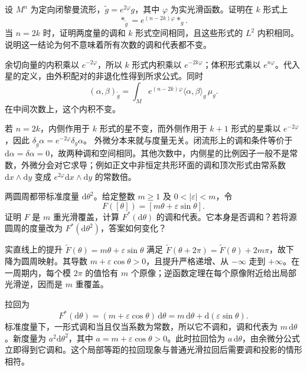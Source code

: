 \begin{exercise}\label{g3:ex:conformal-middle-hodge}
	设 \(M^n\) 为定向闭黎曼流形，\(\widetilde g=e^{2\varphi}g\)，其中 \(\varphi\) 为实光滑函数。证明在 \(k\) 形式上
	\[
		*_{\widetilde g}=e^{(n-2k)\varphi}*_g.
	\]
	当 \(n=2k\) 时，证明两度量的调和 \(k\) 形式空间相同，且这些形式的 \(L^2\) 内积相同。说明这一结论为何不意味着所有次数的调和代表都不变。
\end{exercise}
\begin{solution}
	余切向量的内积乘以 \(e^{-2\varphi}\)，所以 \(k\) 形式内积乘以 \(e^{-2k\varphi}\)；体积形式乘以 \(e^{n\varphi}\)。代入星的定义，由外积配对的非退化性得到所求公式。同时
	\[
		(\alpha,\beta)_{\widetilde g}
		=\int_M e^{(n-2k)\varphi}\langle\alpha,\beta\rangle_g\,\mu_g.
	\]
	在中间次数上，这个内积不变。

	若 \(n=2k\)，内侧作用于 \(k\) 形式的星不变，而外侧作用于 \(k+1\) 形式的星乘以 \(e^{-2\varphi}\)，因此
	\(\delta_{\widetilde g}\alpha=e^{-2\varphi}\delta_g\alpha\)。
	外微分本来就与度量无关。闭流形上的调和条件等价于 \(\mathrm d\alpha=\delta\alpha=0\)，故两种调和空间相同。其他次数中，内侧星的比例因子一般不是常数，外微分会对它求导；例如正文中非恒定共形环面的调和顶次形式由常系数 \(\mathrm dx\wedge\mathrm dy\) 变成 \(e^{2\varphi}\mathrm dx\wedge\mathrm dy\) 的常数倍。
\end{solution}

\begin{exercise}\label{g3:ex:circle-pullback-projection}
	两圆周都带标准度量 \(\mathrm d\theta^2\)。给定整数 \(m\ge1\) 及 \(0<|\varepsilon|<m\)，令
	\[
		F([\theta])=[m\theta+\varepsilon\sin\theta].
	\]
	证明 \(F\) 是 \(m\) 重光滑覆盖，计算 \(F^*(\mathrm d\theta)\) 的调和代表。它本身是否调和？若将源圆周的度量改为 \(F^*(\mathrm d\theta^2)\)，答案如何变化？
\end{exercise}
\begin{solution}
	实直线上的提升 \(\widetilde F(\theta)=m\theta+\varepsilon\sin\theta\) 满足
	\(\widetilde F(\theta+2\pi)=\widetilde F(\theta)+2m\pi\)，故下降为圆周映射。其导数 \(m+\varepsilon\cos\theta>0\)，且提升严格递增、从 \(-\infty\) 走到 \(+\infty\)。在一周期内，每个模 \(2\pi\) 的值恰有 \(m\) 个原像；逆函数定理在每个原像附近给出局部光滑逆，因而是 \(m\) 重覆盖。

	拉回为
	\[
		F^*(\mathrm d\theta)
		=(m+\varepsilon\cos\theta)\,\mathrm d\theta
		=m\,\mathrm d\theta+\mathrm d(\varepsilon\sin\theta).
	\]
	标准度量下，一形式调和当且仅当系数为常数，所以它不调和，调和代表为 \(m\,\mathrm d\theta\)。新度量为 \(a^2\mathrm d\theta^2\)，其中 \(a=m+\varepsilon\cos\theta>0\)。此时拉回恰为 \(a\,\mathrm d\theta\)，由余微分公式立即得到它调和。这个局部等距的拉回现象与普通光滑拉回后需要调和投影的情形相符。
\end{solution}

